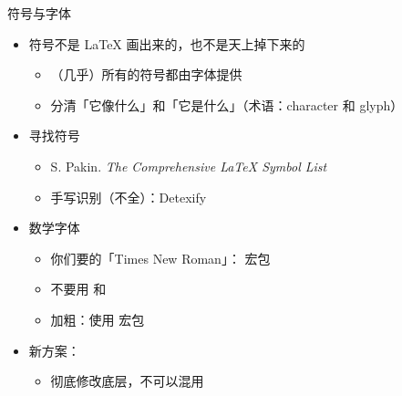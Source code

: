 \begin{frame}{符号与字体}
\begin{itemize}
  \item 符号不是 \LaTeX{} 画出来的，也不是天上掉下来的
    \begin{itemize}
      \item （几乎）所有的符号都由字体提供
      \item 分清「它像什么」和「它是什么」（术语：character 和 glyph）
    \end{itemize}
  \item 寻找符号
    \begin{itemize}
      \item S. Pakin. \emph{The Comprehensive \LaTeX{} Symbol List}
      \item 手写识别（不全）：Detexify 
    \end{itemize}
  \item 数学字体
    \begin{itemize}
      \item 你们要的「Times New Roman」： 宏包
      \item \alert{不要用  和 }
      \item 加粗：使用  宏包
    \end{itemize}
  \item 新方案：
    \begin{itemize}
      \item 彻底修改底层，不可以混用
    \end{itemize}
\end{itemize}
\end{frame}

